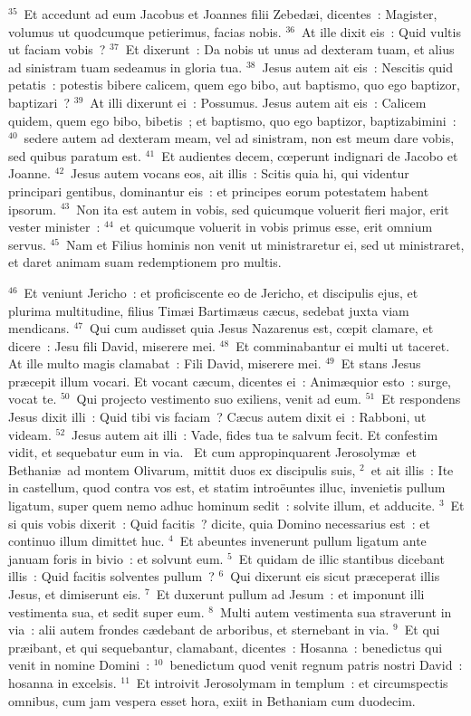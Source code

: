 ${}^{35}$~Et accedunt ad eum Jacobus et Joannes filii Zebed\ae i, dicentes~: Magister, volumus ut quodcumque petierimus, facias nobis.
${}^{36}$~At ille dixit eis~: Quid vultis ut faciam vobis~?
${}^{37}$~Et dixerunt~: Da nobis ut unus ad dexteram tuam, et alius ad sinistram tuam sedeamus in gloria tua.
${}^{38}$~Jesus autem ait eis~: Nescitis quid petatis~: potestis bibere calicem, quem ego bibo, aut baptismo, quo ego baptizor, baptizari~?
${}^{39}$~At illi dixerunt ei~: Possumus. Jesus autem ait eis~: Calicem quidem, quem ego bibo, bibetis~; et baptismo, quo ego baptizor, baptizabimini~:
${}^{40}$~sedere autem ad dexteram meam, vel ad sinistram, non est meum dare vobis, sed quibus paratum est.
${}^{41}$~Et audientes decem, cœperunt indignari de Jacobo et Joanne.
${}^{42}$~Jesus autem vocans eos, ait illis~: Scitis quia hi, qui videntur principari gentibus, dominantur eis~: et principes eorum potestatem habent ipsorum.
${}^{43}$~Non ita est autem in vobis, sed quicumque voluerit fieri major, erit vester minister~:
${}^{44}$~et quicumque voluerit in vobis primus esse, erit omnium servus.
${}^{45}$~Nam et Filius hominis non venit ut ministraretur ei, sed ut ministraret, et daret animam suam redemptionem pro multis.


${}^{46}$~Et veniunt Jericho~: et proficiscente eo de Jericho, et discipulis ejus, et plurima multitudine, filius Tim\ae i Bartim\ae us c\ae cus, sedebat juxta viam mendicans.
${}^{47}$~Qui cum audisset quia Jesus Nazarenus est, cœpit clamare, et dicere~: Jesu fili David, miserere mei.
${}^{48}$~Et comminabantur ei multi ut taceret. At ille multo magis clamabat~: Fili David, miserere mei.
${}^{49}$~Et stans Jesus pr\ae cepit illum vocari. Et vocant c\ae cum, dicentes ei~: Anim\ae quior esto~: surge, vocat te.
${}^{50}$~Qui projecto vestimento suo exiliens, venit ad eum.
${}^{51}$~Et respondens Jesus dixit illi~: Quid tibi vis faciam~? C\ae cus autem dixit ei~: Rabboni, ut videam.
${}^{52}$~Jesus autem ait illi~: Vade, fides tua te salvum fecit. Et confestim vidit, et sequebatur eum in via.
~Et cum appropinquarent Jerosolym\ae\ et Bethani\ae\ ad montem Olivarum, mittit duos ex discipulis suis,
${}^{2}$~et ait illis~: Ite in castellum, quod contra vos est, et statim intro\"euntes illuc, invenietis pullum ligatum, super quem nemo adhuc hominum sedit~: solvite illum, et adducite.
${}^{3}$~Et si quis vobis dixerit~: Quid facitis~? dicite, quia Domino necessarius est~: et continuo illum dimittet huc.
${}^{4}$~Et abeuntes invenerunt pullum ligatum ante januam foris in bivio~: et solvunt eum.
${}^{5}$~Et quidam de illic stantibus dicebant illis~: Quid facitis solventes pullum~?
${}^{6}$~Qui dixerunt eis sicut pr\ae ceperat illis Jesus, et dimiserunt eis.
${}^{7}$~Et duxerunt pullum ad Jesum~: et imponunt illi vestimenta sua, et sedit super eum.
${}^{8}$~Multi autem vestimenta sua straverunt in via~: alii autem frondes c\ae debant de arboribus, et sternebant in via.
${}^{9}$~Et qui pr\ae ibant, et qui sequebantur, clamabant, dicentes~: Hosanna~: benedictus qui venit in nomine Domini~:
${}^{10}$~benedictum quod venit regnum patris nostri David~: hosanna in excelsis.
${}^{11}$~Et introivit Jerosolymam in templum~: et circumspectis omnibus, cum jam vespera esset hora, exiit in Bethaniam cum duodecim.


